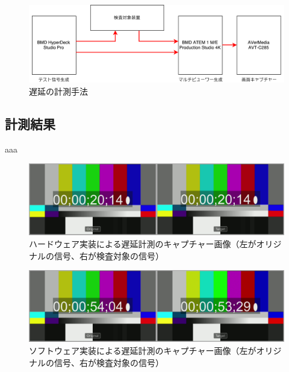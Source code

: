 \begin{figure}[htbp]
  \begin{center}
    \includegraphics[bb=0 0 697 212,width=15cm]{img/evaluate-diagram.pdf}
  \end{center}
  \caption{遅延の計測手法}
  \label{fig:evaluate-diagram}
\end{figure}

\subsection{計測結果}

aaa

\begin{figure}[htbp]
  \begin{center}
    \includegraphics[bb=0 0 1920 540,width=14cm]{img/evaluate-delay-hardware.png}
  \end{center}
  \caption[ハードウェア実装による遅延計測のキャプチャー画像]{ハードウェア実装による遅延計測のキャプチャー画像（左がオリジナルの信号、右が検査対象の信号）}
  \label{fig:evaluate-delay-hardware}
\end{figure}

\begin{figure}[htbp]
  \begin{center}
    \includegraphics[bb=0 0 1920 540,width=14cm]{img/evaluate-delay-software-1.png}
  \end{center}
  \caption[ソフトウェア実装による遅延計測のキャプチャー画像]{ソフトウェア実装による遅延計測のキャプチャー画像（左がオリジナルの信号、右が検査対象の信号）}
  \label{fig:evaluate-delay-software-1}
\end{figure}

